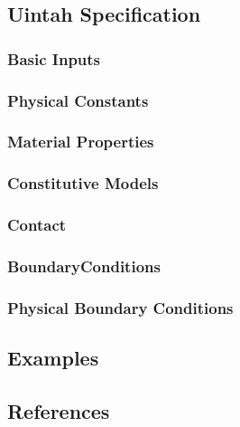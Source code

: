 \subsection{Uintah Specification}

\subsubsection{Basic Inputs}
\subsubsection{Physical Constants}
\subsubsection{Material Properties}
\subsubsection{Constitutive Models}
\subsubsection{Contact}
\subsubsection{BoundaryConditions}
\subsubsection{Physical Boundary Conditions} \label{PhysicalBCs}

\subsection{Examples}

\subsection{References}


